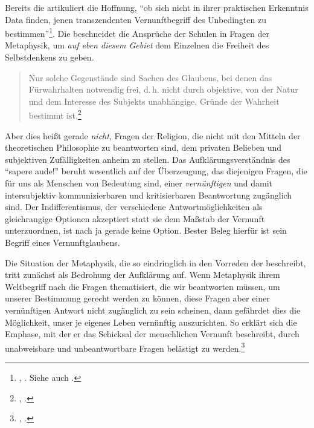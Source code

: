 \begin{nummerierung}
Bereits die  artikuliert
die Hoffnung, \enquote{ob sich nicht in ihrer praktischen Erkenntnis Data
finden, jenen transzendenten Vernunftbegriff des Unbedingten zu
bestimmen}\footnote{\cite[][B xxi]{Kant:KritikderreinenVernunft2003},
\cite[][III: 14.16--18]{Kant:GesammelteWerke1900ff.}. Siehe auch
\cite[][B xxiv\,f.,]{Kant:KritikderreinenVernunft2003}
\cite[][III: 16.9--16]{Kant:GesammelteWerke1900ff.}.}.
Die  beschneidet die Ansprüche der Schulen in
Fragen der Metaphysik, um \emph{auf eben diesem Gebiet} dem Einzelnen die
Freiheit des Selbstdenkens zu geben.
\begin{quote}
Nur solche Gegenstände sind Sachen des Glaubens, bei denen das Fürwahrhalten
notwendig frei, d.\,h. nicht durch objektive, von der Natur und dem Interesse
des Subjekts unabhängige, Gründe der Wahrheit bestimmt
ist.\footnote{\cite[][A 106]{Kant:ImmanuelKantsLogik1977},
\cite[][IX: 70.9--12]{Kant:GesammelteWerke1900ff.}.}
\end{quote}
Aber dies heißt gerade \emph{nicht}, Fragen der Religion, die nicht mit den
Mitteln der theoretischen Philosophie zu beantworten sind, dem privaten Belieben
und subjektiven Zufälligkeiten anheim zu stellen. Das Aufklärungsverständnis des
\enquote{sapere aude!} beruht wesentlich auf der Überzeugung, das diejenigen
Fragen, die für uns als Menschen von Bedeutung sind, einer \emph{vernünftigen}
und damit intersubjektiv kommunizierbaren und kritisierbaren Beantwortung
zugänglich sind. Der Indifferentismus, der verschiedene Antwortmöglichkeiten als
gleichrangige Optionen akzeptiert statt
sie dem Maßstab der Vernunft unterzuordnen, ist nach  ja gerade
keine Option. Bester Beleg hierfür ist sein Begriff eines Vernunftglaubens.
\end{nummerierung}

Die Situation der Metaphysik, die  so eindringlich in den
Vorreden der  beschreibt, tritt zunächst
als Bedrohung der Aufklärung auf. Wenn Metaphysik ihrem Weltbegriff nach die
Fragen thematisiert, die wir beantworten müssen, um unserer Bestimmung gerecht
werden zu können, diese Fragen aber einer vernünftigen Antwort nicht zugänglich
zu sein scheinen, dann gefährdet dies die Möglichkeit, unser je eigenes Leben
vernünftig auszurichten. So erklärt sich die Emphase, mit der er das Schicksal
der menschlichen Vernunft beschreibt, durch unabweisbare und unbeantwortbare
Fragen belästigt zu
werden.\footnote{\cite[Vgl.][A vii]{Kant:KritikderreinenVernunft2003},
\cite[][IV: 7.2--6]{Kant:GesammelteWerke1900ff.}.}

